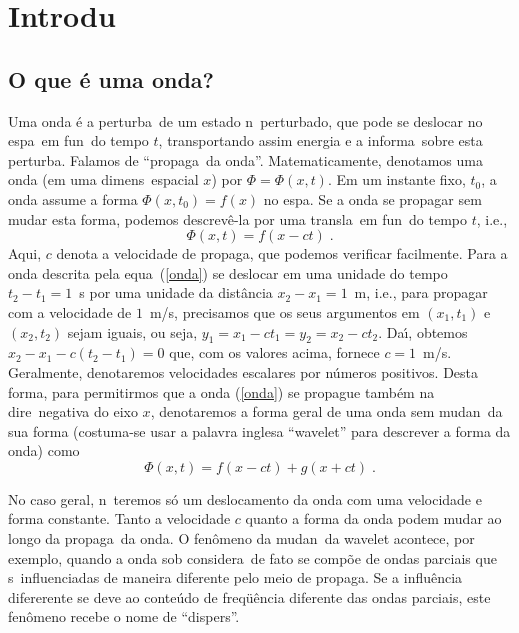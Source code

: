 
\chapter{Introdu\cao}

\section{O que \'e uma onda?}

Uma onda \'e a perturba\cao\ de um estado n\ao\ perturbado, que pode se
deslocar no espa\co\ em fun\cao\ do tempo $t$, transportando assim energia
e a informa\cao\ sobre esta perturba\cao. Falamos de ``propaga\cao\ da
onda''. Matematicamente, denotamos uma
onda (em uma dimens\ao\ espacial $x$) por $\Phi = \Phi(x,t)$. Em um instante
fixo, $t_0$, a onda assume a forma $\Phi(x,t_0) = f(x)$ no espa\co.
Se a onda se propagar sem mudar esta forma, podemos descrev\^e-la por
uma transla\cao\ em fun\cao\ do tempo $t$, i.e., 
\begin{equation}
\Phi(x,t) = f(x-ct) \; .
\label{onda}
\end{equation}
Aqui, $c$ denota a velocidade de propaga\cao, que podemos verificar
facilmente. Para a onda descrita pela equa\cao\ (\ref{onda}) se deslocar
em uma unidade do tempo $t_2-t_1 = 1$~s por uma unidade da dist\^ancia
$x_2-x_1 = 1$~m, i.e., para propagar com a velocidade de $1$~m/s,
precisamos que os seus argumentos em $(x_1,t_1)$ e $(x_2,t_2)$ sejam
iguais, ou seja, $y_1=x_1-ct_1=y_2=x_2-ct_2$. Da\'{\i}, obtemos $x_2-x_1
- c(t_2-t_1) = 0$ que, com os valores acima, fornece $c=1$~m/s.
Geralmente, denotaremos velocidades escalares por n\'umeros positivos.
Desta forma, para permitirmos que a onda (\ref{onda}) se propague
tamb\'em na dire\cao\ negativa do eixo $x$, denotaremos a forma geral de
uma onda sem mudan\ca\ da sua forma (costuma-se usar a palavra inglesa
``wavelet'' para descrever a forma da onda) como
\begin{equation}
\Phi(x,t) = f(x-ct) + g(x+ct) \; .
\label{onda2}
\end{equation}

No caso geral, n\ao\ teremos s\'o um deslocamento da onda com uma
velocidade e forma constante. Tanto a velocidade $c$ quanto a forma da
onda podem mudar ao longo da propaga\cao\ da onda. O fen\^omeno da
mudan\ca\ da wavelet acontece, por exemplo, quando a onda sob
considera\cao\ de fato se comp\~oe de ondas parciais que s\ao\
influenciadas de maneira diferente pelo meio de propaga\cao. Se a
influ\^encia difererente se deve ao conte\'udo de freq\"u\^encia
diferente das ondas parciais, este fen\^omeno recebe o nome de
``dispers\ao''.

